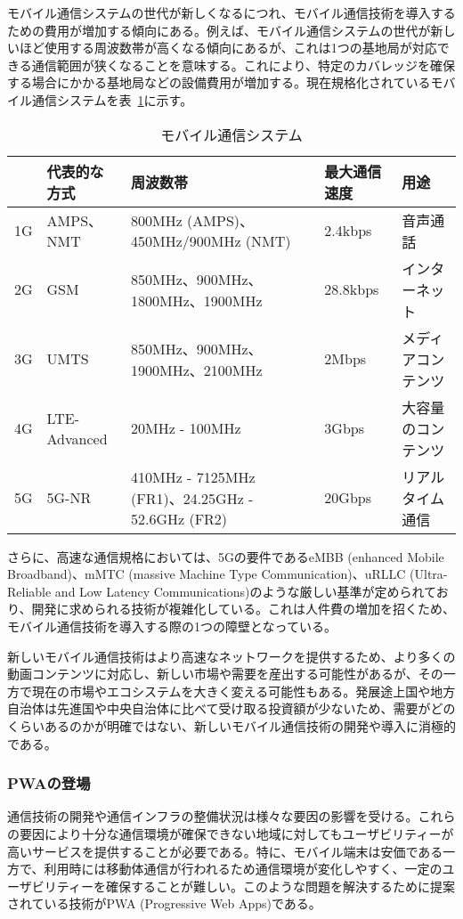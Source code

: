 モバイル通信システムの世代が新しくなるにつれ、モバイル通信技術を導入するための費用が増加する傾向にある。例えば、モバイル通信システムの世代が新しいほど使用する周波数帯が高くなる傾向にあるが、これは1つの基地局が対応できる通信範囲が狭くなることを意味する。これにより、特定のカバレッジを確保する場合にかかる基地局などの設備費用が増加する。現在規格化されているモバイル通信システムを表~\ref{table:モバイル通信システム}に示す。
\begin{table}
    \centering
    \caption{モバイル通信システム}
    \label{table:モバイル通信システム}
    \begin{tabular}{|p{3em}|p{10em}|p{12em}|p{5em}|p{10em}|}
         \hline
         & 代表的な方式 & 周波数帯 & 最大通信速度 & 用途 \\ \hline
         1G & AMPS、NMT & 800MHz (AMPS)、450MHz/900MHz (NMT) & 2.4kbps & 音声通話 \\ \hline
         2G & GSM & 850MHz、900MHz、1800MHz、1900MHz & 28.8kbps & インターネット \\ \hline
         3G & UMTS & 850MHz、900MHz、1900MHz、2100MHz & 2Mbps & メディアコンテンツ \\ \hline
         4G & LTE-Advanced & 20MHz - 100MHz & 3Gbps & 大容量のコンテンツ \\ \hline
         5G & 5G-NR & 410MHz - 7125MHz (FR1)、24.25GHz - 52.6GHz (FR2) & 20Gbps & リアルタイム通信 \\ \hline
    \end{tabular}
\end{table}

さらに、高速な通信規格においては、5Gの要件であるeMBB (enhanced Mobile Broadband)、mMTC (massive Machine Type Communication)、uRLLC (Ultra-Reliable and Low Latency Communications)のような厳しい基準が定められており、開発に求められる技術が複雑化している。これは人件費の増加を招くため、モバイル通信技術を導入する際の1つの障壁となっている。

新しいモバイル通信技術はより高速なネットワークを提供するため、より多くの動画コンテンツに対応し、新しい市場や需要を産出する可能性があるが、その一方で現在の市場やエコシステムを大きく変える可能性もある。発展途上国や地方自治体は先進国や中央自治体に比べて受け取る投資額が少ないため、需要がどのくらいあるのかが明確ではない、新しいモバイル通信技術の開発や導入に消極的である。
\subsubsection{PWAの登場}
\label{subsubsection:PWAの登場}
通信技術の開発や通信インフラの整備状況は様々な要因の影響を受ける。これらの要因により十分な通信環境が確保できない地域に対してもユーザビリティーが高いサービスを提供することが必要である。特に、モバイル端末は安価である一方で、利用時には移動体通信が行われるため通信環境が変化しやすく、一定のユーザビリティーを確保することが難しい。このような問題を解決するために提案されている技術がPWA (Progressive Web Apps)である。

